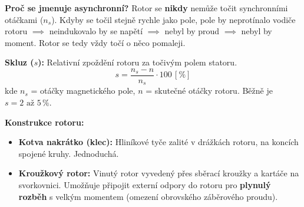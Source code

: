 \documentclass[a4paper,10pt]{article}
\newcommand{\jednotka}[1]{\,[\mathrm{#1}]}
\begin{document}
\begin{vysvetlenibox}
\begin{durazbox}
\textbf{Proč se jmenuje asynchronní?} Rotor se \textbf{nikdy} nemůže točit synchronními otáčkami ($n_s$). Kdyby se točil stejně rychle jako pole, pole by neprotínalo vodiče rotoru $\implies$ neindukovalo by se napětí $\implies$ nebyl by proud $\implies$ nebyl by moment. Rotor se tedy vždy točí o něco pomaleji.
\end{durazbox}

\begin{vzorcebox}
\textbf{Skluz ($s$):} Relativní zpoždění rotoru za točivým polem statoru.
\[
s = \frac{n_s - n}{n_s} \cdot 100 \jednotka{\%}
\]
kde $n_s$ = otáčky magnetického pole, $n$ = skutečné otáčky rotoru. Běžně je $s = 2 \text{ až } 5\,\%$.
\end{vzorcebox}

\textbf{Konstrukce rotoru:}
\begin{itemize}
  \item \textbf{Kotva nakrátko (klec):} Hliníkové tyče zalité v drážkách rotoru, na koncích spojené kruhy. Jednoduchá.
  \item \textbf{Kroužkový rotor:} Vinutý rotor vyvedený přes sběrací kroužky a kartáče na svorkovnici. Umožňuje připojit externí odpory do rotoru pro \textbf{plynulý rozběh} s velkým momentem (omezení obrovského záběrového proudu).
\end{itemize}

\begin{center}
\end{center}


\end{vysvetlenibox}
\end{document}
